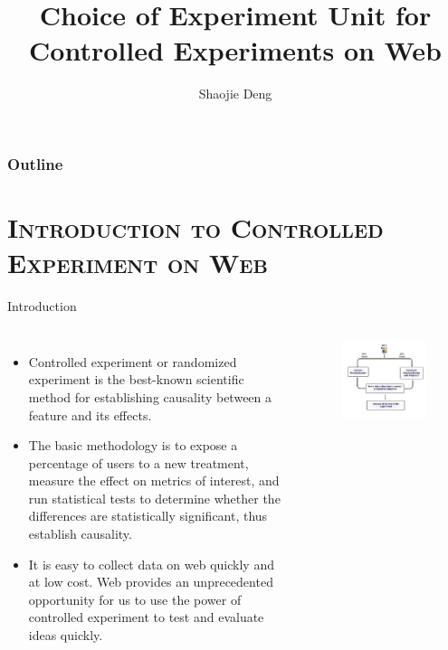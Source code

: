 \documentclass[xcolor=x11names,table]{beamer}
\title[Experiment Unit] %
{Choice of Experiment Unit for Controlled Experiments on Web}
\author %
{Shaojie Deng}
\institute[Microsoft] %
{
  One Microsoft Way\\
  Microsoft
  }
\date{}
\begin{document}
\begin{frame}  
  \titlepage
\end{frame}

\begin{frame}
  \frametitle{Outline}
\footnotesize
  \tableofcontents
\end{frame}

\section{\scshape Introduction to Controlled Experiment on Web}
\begin{frame}{Introduction}
\footnotesize
\begin{columns}[t]
\column{2.8in}
\begin{itemize}
\item Controlled experiment or randomized experiment is the best-known scientific method for establishing causality between a feature and its effects.
\item The basic  methodology is to expose a percentage of users to a new treatment, measure the effect on metrics of interest, and run statistical tests to determine whether the differences are statistically significant, thus establish causality.
\item It is easy to collect data on web quickly and at low cost. Web provides an unprecedented opportunity for us to use the power of controlled experiment to test and evaluate ideas quickly.
\end{itemize}
\column{1.5in}
\begin{figure}[!htbp]
  \centering
  \includegraphics[width=1.2\textwidth]{split}
\end{figure}
\end{columns}
\end{frame}
\end{document}
